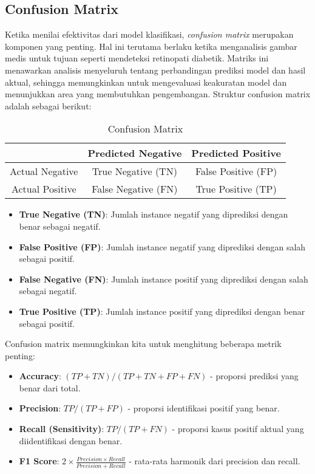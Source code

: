 \subsection{Confusion Matrix}
Ketika menilai efektivitas dari model klasifikasi, \emph{confusion matrix} merupakan komponen yang penting. Hal ini terutama berlaku ketika menganalisis gambar medis untuk tujuan seperti mendeteksi retinopati diabetik. Matriks ini menawarkan analisis menyeluruh tentang perbandingan prediksi model dan hasil aktual, sehingga memungkinkan untuk mengevaluasi keakuratan model dan menunjukkan area yang membutuhkan pengembangan.
Struktur confusion matrix adalah sebagai berikut:

\begin{longtable}{|c|c|c|}
    \caption{Confusion Matrix}
    \label{tb:confusion_matrix}                                  \\
    \hline
    & Predicted Negative & Predicted Positive \\
    \hline
    Actual Negative & True Negative (TN) & False Positive (FP) \\
    \hline
    Actual Positive & False Negative (FN) & True Positive (TP) \\
    \hline
\end{longtable}

\begin{itemize}
    \item \textbf{True Negative (TN)}: Jumlah instance negatif yang diprediksi dengan benar sebagai negatif.
    \item \textbf{False Positive (FP)}: Jumlah instance negatif yang diprediksi dengan salah sebagai positif.
    \item \textbf{False Negative (FN)}: Jumlah instance positif yang diprediksi dengan salah sebagai negatif.
    \item \textbf{True Positive (TP)}: Jumlah instance positif yang diprediksi dengan benar sebagai positif.
\end{itemize}

Confusion matrix memungkinkan kita untuk menghitung beberapa metrik penting:

\begin{itemize}
    \item \textbf{Accuracy}: $(TP + TN) / (TP + TN + FP + FN)$ - proporsi prediksi yang benar dari total.
    \item \textbf{Precision}: $TP / (TP + FP)$ - proporsi identifikasi positif yang benar.
    \item \textbf{Recall (Sensitivity)}: $TP / (TP + FN)$ - proporsi kasus positif aktual yang diidentifikasi dengan benar.
    \item \textbf{F1 Score}: $2 \times \frac{Precision \times Recall}{Precision + Recall}$ - rata-rata harmonik dari precision dan recall.
\end{itemize}


